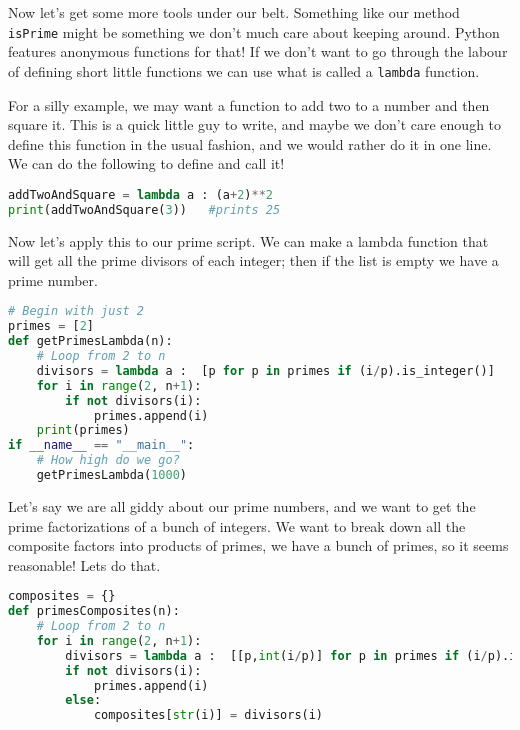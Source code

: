 \documentclass[12pt, twoside, reqno]{book}
\begin{document}
Now let's get some more tools under our belt. Something like our method \texttt{isPrime} might be something we don't much care about keeping around. Python features anonymous functions for that! If we don't want to go through the labour of defining short little functions we can use what is called a \texttt{lambda} function.

For a silly example, we may want a function to add two to a number and then square it. This is a quick little guy to write, and maybe we don't care enough to define this function in the usual fashion, and we would rather do it in one line. We can do the following to define and call it!
\begin{lstlisting}[language=Python]
addTwoAndSquare = lambda a : (a+2)**2
print(addTwoAndSquare(3))   #prints 25
\end{lstlisting}

Now let's apply this to our prime script. We can make a lambda function that will get all the prime divisors of each integer; then if the list is empty we have a prime number.
\begin{lstlisting}[language=Python]
# Begin with just 2
primes = [2]
def getPrimesLambda(n):
    # Loop from 2 to n
    divisors = lambda a :  [p for p in primes if (i/p).is_integer()]
    for i in range(2, n+1):
        if not divisors(i):
            primes.append(i)
    print(primes)
if __name__ == "__main__":
    # How high do we go?
    getPrimesLambda(1000)
\end{lstlisting}

Let's say we are all giddy about our prime numbers, and we want to get the prime factorizations of a bunch of integers. We want to break down all the composite factors into products of primes, we have a bunch of primes, so it seems reasonable! Lets do that.
\begin{lstlisting}[language=Python]
composites = {}
def primesComposites(n):
    # Loop from 2 to n
    for i in range(2, n+1):
        divisors = lambda a :  [[p,int(i/p)] for p in primes if (i/p).is_integer()]
        if not divisors(i):
            primes.append(i)
        else:
            composites[str(i)] = divisors(i)
\end{lstlisting}
\end{document}
